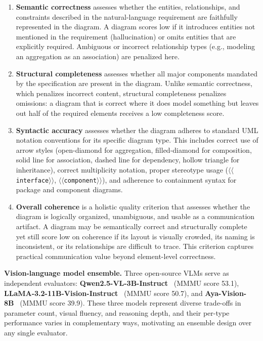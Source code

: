 \documentclass[conference]{IEEEtran}
\begin{document}
\begin{enumerate}
  \item \textbf{Semantic correctness} assesses whether the entities,
    relationships, and constraints described in the natural-language
    requirement are faithfully represented in the diagram. A diagram
    scores low if it introduces entities not mentioned in the
    requirement (hallucination) or omits entities that are explicitly
    required. Ambiguous or incorrect relationship types
    (e.g., modeling an aggregation as an association) are penalized
    here.

  \item \textbf{Structural completeness} assesses whether all major
    components mandated by the specification are present in the
    diagram. Unlike semantic correctness, which penalizes incorrect
    content, structural completeness penalizes omissions: a diagram
    that is correct where it does model something but leaves out
    half of the required elements receives a low completeness score.

  \item \textbf{Syntactic accuracy} assesses whether the diagram
    adheres to standard UML notation conventions for its specific
    diagram type. This includes correct use of arrow styles
    (open-diamond for aggregation, filled-diamond for composition,
    solid line for association, dashed line for dependency, hollow
    triangle for inheritance), correct multiplicity notation, proper
    stereotype usage (\texttt{$\langle\langle$interface$\rangle\rangle$},
    \texttt{$\langle\langle$component$\rangle\rangle$}), and adherence
    to containment syntax for package and component diagrams.

  \item \textbf{Overall coherence} is a holistic quality criterion
    that assesses whether the diagram is logically organized,
    unambiguous, and usable as a communication artifact. A diagram
    may be semantically correct and structurally complete yet still
    score low on coherence if its layout is visually crowded, its
    naming is inconsistent, or its relationships are difficult to
    trace. This criterion captures practical communication value
    beyond element-level correctness.
\end{enumerate}

\textbf{Vision-language model ensemble.}
Three open-source VLMs serve as independent evaluators:
\textbf{Qwen2.5-VL-3B-Instruct}~\cite{qwen25vl} (MMMU score 53.1),
\textbf{LLaMA-3.2-11B-Vision-Instruct}~\cite{llama3herd} (MMMU score
50.7), and \textbf{Aya-Vision-8B}~\cite{ustun2024aya} (MMMU score
39.9). These three models represent diverse trade-offs in parameter
count, visual fluency, and reasoning depth, and their per-type
performance varies in complementary ways, motivating an ensemble
design over any single evaluator.
\end{document}
